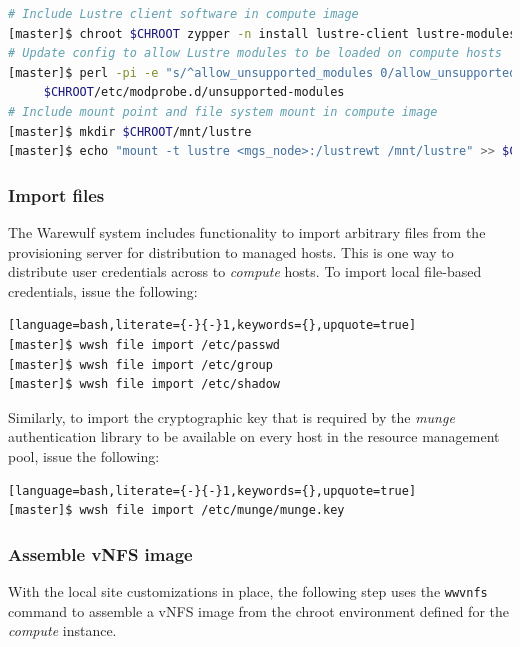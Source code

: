 \documentclass[letterpaper]{article}
\begin{document}
\begin{lstlisting}[language=bash,keywords={},upquote=true]
# Include Lustre client software in compute image
[master]$ chroot $CHROOT zypper -n install lustre-client lustre-modules
# Update config to allow Lustre modules to be loaded on compute hosts
[master]$ perl -pi -e "s/^allow_unsupported_modules 0/allow_unsupported_modules 1/" \
     $CHROOT/etc/modprobe.d/unsupported-modules
# Include mount point and file system mount in compute image
[master]$ mkdir $CHROOT/mnt/lustre
[master]$ echo "mount -t lustre <mgs_node>:/lustrewt /mnt/lustre" >> $CHROOT/etc/fstab
\end{lstlisting}

\subsubsection{Import files} \label{sec:file_import}

The Warewulf system includes functionality to import arbitrary files from the
provisioning server for distribution to managed hosts. This is one way
to distribute user credentials across to {\em compute} hosts. To
import local file-based credentials, issue the following:

\begin{lstlisting}[language=bash,literate={-}{-}1,keywords={},upquote=true]
[master]$ wwsh file import /etc/passwd                                                                                                       
[master]$ wwsh file import /etc/group
[master]$ wwsh file import /etc/shadow 
\end{lstlisting}

Similarly, to import the cryptographic key that is required by the {\em munge}
authentication library to be available on every host in the resource management
pool, issue the following:

\begin{lstlisting}[language=bash,literate={-}{-}1,keywords={},upquote=true]
[master]$ wwsh file import /etc/munge/munge.key
\end{lstlisting}


\subsubsection{Assemble vNFS image}

With the local site customizations in place, the following step uses the
\texttt{wwvnfs} command to assemble a vNFS image from the chroot environment
defined for the {\em compute} instance. 
\end{document}
